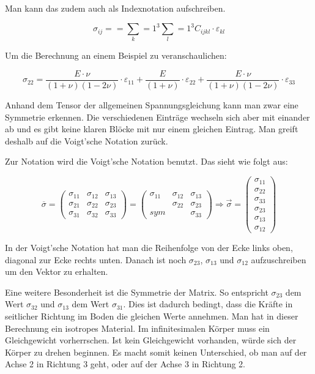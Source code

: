Man kann das zudem auch als Indexnotation aufschreiben.

\[
\sigma_{ij}
=
=
\sum_k=1^3
\sum_l=1^3
C_{ijkl}\cdot\varepsilon_{kl}
\]

Um die Berechnung an einem Beispiel zu veranschaulichen:

\[
\sigma_{22}
=
\frac{E\cdot\nu}{(1+\nu)(1-2\nu)}\cdot\varepsilon_{11}+\frac{E}{(1+\nu)}\cdot\varepsilon_{22}+\frac{E\cdot\nu}{(1+\nu)(1-2\nu)}\cdot\varepsilon_{33}
\]

Anhand dem Tensor der allgemeinen Spannungsgleichung kann man zwar eine Symmetrie erkennen.
Die verschiedenen Einträge wechseln sich aber mit einander ab und es gibt keine klaren Blöcke mit nur einem gleichen Eintrag.
Man greift deshalb auf die Voigt'sche Notation zurück.


Zur Notation wird die Voigt'sche Notation benutzt. Das sieht wie folgt aus:

\[
\overline{\sigma}
=
\begin{pmatrix}
	\sigma_{11} & \sigma_{12} & \sigma_{13} \\ 
	\sigma_{21} & \sigma_{22} & \sigma_{23} \\
	\sigma_{31} & \sigma_{32} & \sigma_{33}
\end{pmatrix}
=
\begin{pmatrix}
	\sigma_{11} & \sigma_{12} & \sigma_{13} \\ 
  	            & \sigma_{22} & \sigma_{23} \\
	        sym &             & \sigma_{33} 
\end{pmatrix}
\Rightarrow
\vec{\sigma}
=
\begin{pmatrix}
    \sigma_{11}\\
	\sigma_{22}\\
	\sigma_{33}\\
	\sigma_{23}\\
	\sigma_{13}\\
	\sigma_{12}
\end{pmatrix}
\]

In der Voigt'sche Notation hat man die Reihenfolge von der Ecke links oben, diagonal zur Ecke rechts unten.
Danach ist noch $\sigma_{23}$, $\sigma_{13}$ und $\sigma_{12}$ aufzuschreiben um den Vektor zu erhalten.

Eine weitere Besonderheit ist die Symmetrie der Matrix.
So entspricht $\sigma_{23}$ dem Wert $\sigma_{32}$ und $\sigma_{13}$ dem Wert $\sigma_{31}$.
Dies ist dadurch bedingt, dass die Kräfte in seitlicher Richtung im Boden die gleichen Werte annehmen.
Man hat in dieser Berechnung ein isotropes Material.
Im infinitesimalen Körper muss ein Gleichgewicht vorherrschen.
Ist kein Gleichgewicht vorhanden, würde sich der Körper zu drehen beginnen.
Es macht somit keinen Unterschied, ob man auf der Achse 2 in Richtung 3 geht,
oder auf der Achse 3 in Richtung 2.


